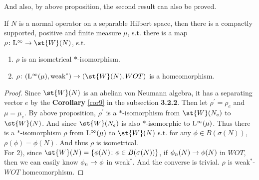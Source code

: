 And also, by above proposition, the second result can also be proved.

\begin{thm}
	If $N$ is a normal operator on a separable Hilbert space, then there is a compactly supported, positive and finite measure $\mu$, s.t. there is a map $\rho \colon \lfs{\infty} \sto \st{W}(N)$, s.t.
	\begin{enumerate}[label=\arabic*)]
		\item $\rho$ is an isometrical $*$-isomorphism.
		\item $\rho \colon (\lfs{\infty}(\mu), \text{weak}^{*}) \sto (\st{W}(N), WOT)$ is a homeomorphism.
	\end{enumerate}
\end{thm}
\begin{proof}
	Since $\st{W}(N)$ is an abelian von Neumann algebra, it has a separating vector $e$ by the \textbf{Corollary} \ref{cor9} in the subsection \textbf{3.2.2}. Then let $\rho^{'} = \rho_e$ and $\mu = \mu_e$. By above proposition, $\rho^{'}$ is a $*$-isomorphism from $\st{W}(N_e)$ to $\st{W}(N)$. And since $\st{W}(N_e)$ is also $*$-isomorphic to $\mathrm{L^{\infty}}(\mu)$. Thus there is a $*$-isomorphism $\rho$ from $\mathrm{L^{\infty}}(\mu)$ to $\st{W}(N)$ s.t. for any $\phi \in B(\sigma(N))$, $\rho(\phi) = \phi(N)$. And thus $\rho$ is isometrical.\\
	For $2)$, since $\st{W}(N) = \{\phi(N) \colon \phi \in B(\sigma(N))\}$, if $\phi_n(N) \rightarrow \phi(N)$ in $WOT$, then we can easily know $\phi_n \rightarrow \phi$ in weak$^{*}$. And the converse is trivial. $\rho$ is weak$^{*}$-$WOT$ homeomorphism.
\end{proof}

